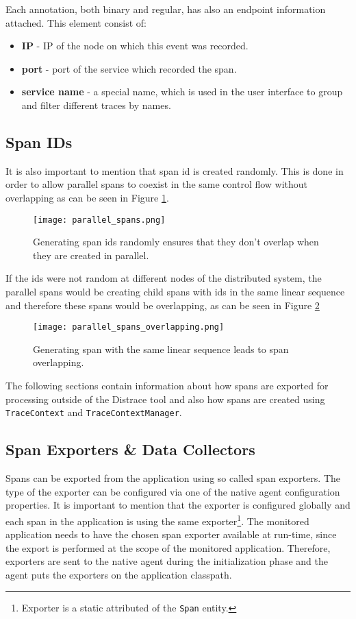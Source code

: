 Each annotation, both binary and regular, has also an endpoint information attached. This element consist of:
\begin{itemize}
	\item \textbf{IP} - IP of the node on which this event was recorded.
	\item \textbf{port} - port of the service which recorded the span.
	\item \textbf{service name} - a special name, which is used in the user interface to group and filter different traces by names.
\end{itemize}

\subsection{Span IDs}
It is also important to mention that span id is created randomly. This is done in order to allow parallel spans to coexist in the same control flow without overlapping as can be seen in Figure \ref{fig:parallel_spans}.

	\begin{figure}
		\centering
		\texttt{[image: parallel\_spans.png]}
		\caption{Generating span ids randomly ensures that they don't overlap when they are created in parallel.}
		\label{fig:parallel_spans}
	\end{figure}
If the ids were not random at different nodes of the distributed system, the parallel spans would be creating child spans with ids in the same linear sequence and therefore these spans would be overlapping, as can be seen in Figure \ref{fig:parallel_spans_overlapping}
	\begin{figure}
		\centering
		\texttt{[image: parallel\_spans\_overlapping.png]}
		\caption{Generating span with the same linear sequence leads to span overlapping.}
		\label{fig:parallel_spans_overlapping}
	\end{figure}
	
The following sections contain information about how spans are exported for processing outside of the Distrace tool and also how spans are created using \texttt{TraceContext} and \texttt{TraceContextManager}.
\subsection{Span Exporters \& Data Collectors}
\label{design:exporter}
Spans can be exported from the application using so called span exporters. The type of the exporter can be configured via one of the native agent configuration properties. It is important to mention that the exporter is configured globally and each span in the application is using the same exporter\footnote{Exporter is a static attributed of the \texttt{Span} entity.}. The monitored application needs to have the chosen span exporter available at run-time, since the export is performed at the scope of the monitored application. Therefore, exporters are sent to the native agent during the initialization phase and the agent puts the exporters on the application classpath.

